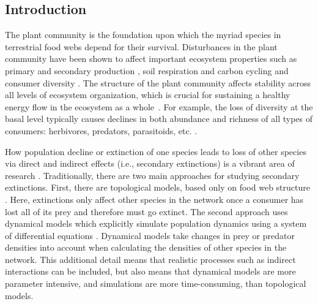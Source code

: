\documentclass[12pt]{article}
\begin{document}
\begin{spacing}{2.0}

\clearpage
\section*{Introduction}

     The plant community is the foundation upon which the myriad species in terrestrial food webs depend for their survival. Disturbances in the plant community have been shown to affect important ecosystem properties such as primary \citep{Hector1999} and secondary production \citep{borer2012plant}, soil respiration and carbon cycling \citep{chen2019plant} and consumer diversity \citep{scherber2010bottom, Baiser2016}.
     The structure of the plant community affects stability across all levels of ecosystem organization, which is crucial for sustaining a healthy energy flow in the ecosystem as a whole~\citep{proulx2010diversity,scherber2010bottom,Rosenblatt2016}. 
     For example, the loss of diversity at the basal level typically causes declines in both abundance and richness of all types of consumers: herbivores, predators, parasitoids, etc. \citep{scherber2010bottom}.
    
    How population decline or extinction of one species leads to loss of other species via direct and indirect effects (i.e., secondary extinctions) is a vibrant area of research \citep{Santos2021,curtsdotter2011robustness, dunne2009cascading, Eklof2006}. Traditionally, there are two main approaches for studying secondary extinctions. First, there are topological models, based only on food web structure \citep{dunne2009cascading}. Here, extinctions only affect other species in the network once a consumer has lost all of its prey and therefore must go extinct. The second approach uses dynamical models which explicitly simulate population dynamics using a system of differential equations \citep{binzer2011susceptibility}. Dynamical models take changes in prey or predator densities into account when calculating the densities of other species in the network. 
    This additional detail means that realistic processes such as indirect interactions can be included, but also means that dynamical models are more parameter intensive, and simulations are more time-consuming, than topological models. 
    

\end{spacing}
\end{document}
